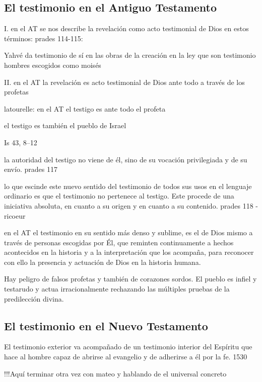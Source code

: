 \subsection{El testimonio en el Antiguo Testamento}

  I. en el AT se nos describe la revelación como acto testimonial de Dios en estos términos:
  prades 114-115:

  Yahvé da testimonio de sí
  en las obras de la creación
  en la ley que son testimonio
  hombres escogidos como moisés

  II. en el AT la revelación es acto testimonial de Dios ante todo a través de los
  profetas

  latourelle: en el AT el testigo es ante todo el profeta

  el testigo es también el pueblo de Israel

Is 43, 8--12

  la autoridad del testigo no viene de él, sino de su vocación privilegiada y de
  su envío. prades 117

  lo que escinde este nuevo sentido del testimonio de todos sus usos en el
  lenguaje ordinario es que el testimonio no pertenece al testigo. Este procede de
  una iniciativa absoluta, en cuanto a su origen y en cuanto a su contenido.
  prades 118 - ricoeur

  en el AT el testimonio en su sentido más denso y sublime, es el de Dios mismo a
  través de personas escogidas por Él, que reminten continuamente a hechos
  acontecidos en la historia y a la interpretación que los acompaña, para
  reconocer con ello la presencia y actuación de Dios en la historia humana.

  Hay peligro de falsos profetas y también de corazones sordos. El pueblo es
  infiel y testarudo y actua irracionalmente rechazando las múltiples pruebas de
  la predilección divina.

\subsection{El testimonio en el Nuevo Testamento}
  El testimonio exterior va acompañado de un testimonio interior del Espíritu que
  hace al hombre capaz de abrirse al evangelio y de adherirse a él por la fe. 1530


!!!Aquí terminar otra vez con mateo y hablando de el universal concreto
